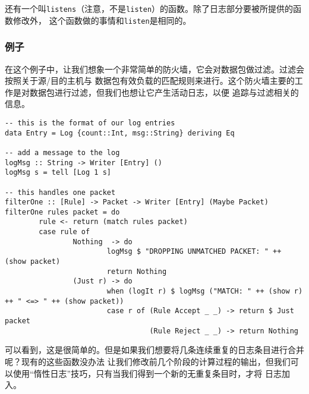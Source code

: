 \indent{}还有一个叫\texttt{listens}（注意，不是\texttt{listen}）的函数。除了日志部分要被所提供的函数修改外，
这个函数做的事情和\texttt{listen}是相同的。

\subsubsection{例子}
在这个例子中，让我们想象一个非常简单的防火墙，它会对数据包做过滤。过滤会按照关于源/目的主机与
数据包有效负载的匹配规则来进行。这个防火墙主要的工作是对数据包进行过滤，但我们也想让它产生活动日志，以便
追踪与过滤相关的信息。
\begin{verbatim}
-- this is the format of our log entries
data Entry = Log {count::Int, msg::String} deriving Eq

-- add a message to the log
logMsg :: String -> Writer [Entry] ()
logMsg s = tell [Log 1 s]

-- this handles one packet
filterOne :: [Rule] -> Packet -> Writer [Entry] (Maybe Packet)
filterOne rules packet = do
        rule <- return (match rules packet)
        case rule of
                Nothing  -> do
                        logMsg $ "DROPPING UNMATCHED PACKET: " ++ (show packet)
                        return Nothing
                (Just r) -> do
                        when (logIt r) $ logMsg ("MATCH: " ++ (show r) ++ " <=> " ++ (show packet))
                        case r of (Rule Accept _ _) -> return $ Just packet
                                  (Rule Reject _ _) -> return Nothing
\end{verbatim}
\indent{}可以看到，这是很简单的。但是如果我们想要将几条连续重复的日志条目进行合并呢？现有的这些函数没办法
让我们修改前几个阶段的计算过程的输出，但我们可以使用“惰性日志”技巧，只有当我们得到一个新的无重复条目时，才将
日志加入。
\vspace{-0.5em}
